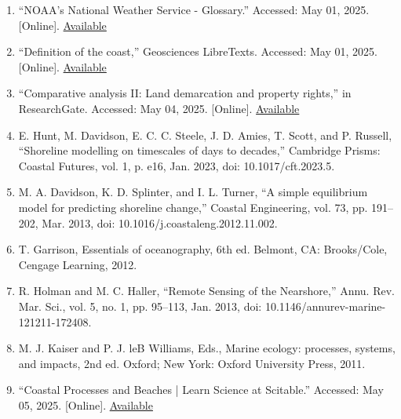 \documentclass{article}
\begin{document}
\begin{enumerate}

    \item {“NOAA’s National Weather Service - Glossary.” Accessed: May 01, 2025. [Online]. \href{https://forecast.weather.gov/glossary.php?word=coastal%20waters}{Available}}
    
    \item {“Definition of the coast,” Geosciences LibreTexts. Accessed: May 01, 2025. [Online]. \href{https://geo.libretexts.org/Bookshelves/Oceanography/Coastal_Dynamics_(Bosboom_and_Stive)/01%3A_Overview/1.05%3A_Coastal_(morpho)_dynamics/1.5.01%3A_Definition_of_the_coast}{Available}}
    
    \item {“Comparative analysis II: Land demarcation and property rights,” in ResearchGate. Accessed: May 04, 2025. [Online]. \href{https://www.researchgate.net/publication/362949604_Comparative_analysis_II_Land_demarcation_and_property_rights}{Available}}
    
    \item {E. Hunt, M. Davidson, E. C. C. Steele, J. D. Amies, T. Scott, and P. Russell, “Shoreline modelling on timescales of days to decades,” Cambridge Prisms: Coastal Futures, vol. 1, p. e16, Jan. 2023, doi: 10.1017/cft.2023.5.}

    \item {M. A. Davidson, K. D. Splinter, and I. L. Turner, “A simple equilibrium model for predicting shoreline change,” Coastal Engineering, vol. 73, pp. 191–202, Mar. 2013, doi: 10.1016/j.coastaleng.2012.11.002.}

    \item {T. Garrison, Essentials of oceanography, 6th ed. Belmont, CA: Brooks/Cole, Cengage Learning, 2012.}

    \item {R. Holman and M. C. Haller, “Remote Sensing of the Nearshore,” Annu. Rev. Mar. Sci., vol. 5, no. 1, pp. 95–113, Jan. 2013, doi: 10.1146/annurev-marine-121211-172408.}

    \item {M. J. Kaiser and P. J. leB Williams, Eds., Marine ecology: processes, systems, and impacts, 2nd ed. Oxford; New York: Oxford University Press, 2011.}

    \item {“Coastal Processes and Beaches | Learn Science at Scitable.” Accessed: May 05, 2025. [Online]. \href{https://www.nature.com/scitable/knowledge/library/coastal-processes-and-beaches-26276621/}{Available}}


\end{enumerate}
\end{document}
